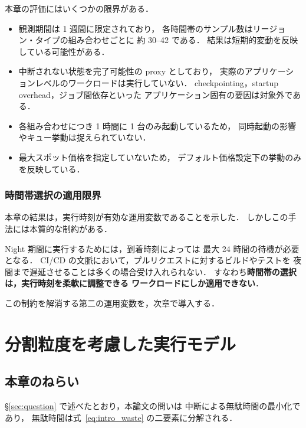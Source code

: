 \documentclass[11pt,a4paper]{ltjsreport}
\begin{document}
本章の評価にはいくつかの限界がある．

\begin{itemize}
  \item 観測期間は 1 週間に限定されており，
        各時間帯のサンプル数はリージョン・タイプの組み合わせごとに
        約 30--42 である．
        結果は短期的変動を反映している可能性がある．
  \item 中断されない状態を完了可能性の proxy としており，
        実際のアプリケーションレベルのワークロードは実行していない．
        checkpointing，startup overhead，ジョブ間依存といった
        アプリケーション固有の要因は対象外である．
  \item 各組み合わせにつき 1 時間に 1 台のみ起動しているため，
        同時起動の影響やキュー挙動は捉えられていない．
  \item 最大スポット価格を指定していないため，
        デフォルト価格設定下の挙動のみを反映している．
\end{itemize}

\subsection{時間帯選択の適用限界}
\label{sec:timeshift_limit}

本章の結果は，実行時刻が有効な運用変数であることを示した．
しかしこの手法には本質的な制約がある．

Night 期間に実行するためには，到着時刻によっては
最大 24 時間の待機が必要となる．
CI/CD の文脈において，プルリクエストに対するビルドやテストを
夜間まで遅延させることは多くの場合受け入れられない．
すなわち\textbf{時間帯の選択は，実行時刻を柔軟に調整できる
ワークロードにしか適用できない}．

この制約を解消する第二の運用変数を，次章で導入する．

\chapter{分割粒度を考慮した実行モデル}
\label{chap:split}

\section{本章のねらい}

\S\ref{sec:question} で述べたとおり，本論文の問いは
中断による無駄時間の最小化であり，
無駄時間は式~\eqref{eq:intro_waste} の二要素に分解される．
\end{document}

